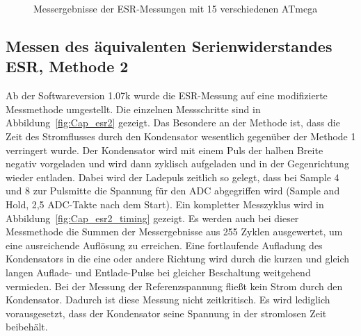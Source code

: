 \begin{figure}[H]
\centering

\caption{Messergebnisse der ESR-Messungen mit 15 verschiedenen ATmega}
\label{fig:Cesr}
\end{figure}

\newpage
\subsection{Messen des äquivalenten Serienwiderstandes ESR, Methode 2}
\label{sec:ESR2}
Ab der Softwareversion 1.07k wurde die ESR-Messung auf eine modifizierte Messmethode umgestellt.
Die einzelnen Messschritte sind in Abbildung~\ref{fig:Cap_esr2} gezeigt. Das Besondere an der Methode
ist, dass die Zeit des Stromflusses durch den Kondensator wesentlich gegenüber der Methode 1 verringert wurde.
Der Kondensator wird mit einem Puls der halben Breite negativ vorgeladen und wird dann zyklisch aufgeladen und in der
Gegenrichtung wieder entladen.
Dabei wird der Ladepuls zeitlich so gelegt, dass bei Sample 4 und 8 zur Pulsmitte
die Spannung für den ADC abgegriffen wird (Sample and Hold, 2,5 ADC-Takte nach dem Start).
Ein kompletter Messzyklus wird in Abbildung~\ref{fig:Cap_esr2_timing} gezeigt.
Es werden auch bei dieser Messmethode die Summen der Messergebnisse aus 255 Zyklen ausgewertet,
um eine ausreichende Auflösung zu erreichen.
Eine fortlaufende Aufladung des Kondensators in die eine oder andere Richtung wird durch die kurzen und
gleich langen Auflade- und Entlade-Pulse bei gleicher Beschaltung weitgehend vermieden.
Bei der Messung der Referenzspannung fließt kein Strom durch den Kondensator. Dadurch ist diese Messung
nicht zeitkritisch. Es wird lediglich vorausgesetzt, dass der Kondensator seine Spannung in der
stromlosen Zeit beibehält.

